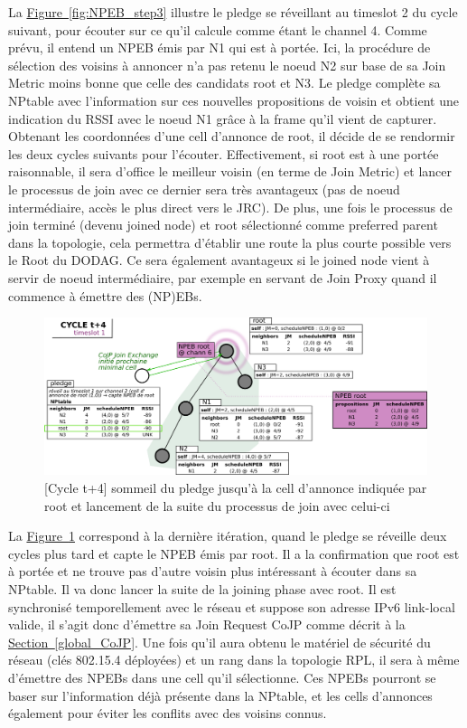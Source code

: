 \documentclass[]{report}
\newcommand{\wordlink}[2]{\hyperref[#2]{#1~\ref{#2}}}
\begin{document}
La \wordlink{Figure}{fig:NPEB_step3} illustre le pledge se réveillant au timeslot 2 du cycle suivant, pour écouter sur ce qu'il calcule comme étant le channel 4. Comme prévu, il entend un NPEB émis par N1 qui est à portée. Ici, la procédure de sélection des voisins à annoncer n'a pas retenu le noeud N2 sur base de sa Join Metric moins bonne que celle des candidats root et N3. Le pledge complète sa NPtable avec l'information sur ces nouvelles propositions de voisin et obtient une indication du RSSI avec le noeud N1 grâce à la frame qu'il vient de capturer. Obtenant les coordonnées d'une cell d'annonce de root, il décide de se rendormir les deux cycles suivants pour l'écouter. Effectivement, si root est à une portée raisonnable, il sera d'office le meilleur voisin (en terme de Join Metric) et lancer le processus de join avec ce dernier sera très avantageux (pas de noeud intermédiaire, accès le plus direct vers le JRC). De plus, une fois le processus de join terminé (devenu joined node) et root sélectionné comme preferred parent dans la topologie, cela permettra d'établir une route la plus courte possible vers le Root du DODAG. Ce sera également avantageux si le joined node vient à servir de noeud intermédiaire, par exemple en servant de Join Proxy quand il commence à émettre des (NP)EBs.

\newpage

 \vspace{0.4cm}
	\begin{figure}[!h]
	\centering
	\includegraphics[width=\linewidth]{NPEB_step4}
	\caption{[Cycle t+4] sommeil du pledge jusqu'à la cell d'annonce indiquée par root et lancement de la suite du processus de join avec celui-ci}
	\label{fig:NPEB_step4}
	\end{figure}
\vspace{0.4cm}

La \wordlink{Figure}{fig:NPEB_step4} correspond à la dernière itération, quand le pledge se réveille deux cycles plus tard et capte le NPEB émis par root. Il a la confirmation que root est à portée et ne trouve pas d'autre voisin plus intéressant à écouter dans sa NPtable. Il va donc lancer la suite de la joining phase avec root. Il est synchronisé temporellement avec le réseau et suppose son adresse IPv6 link-local valide, il s'agit donc d'émettre sa Join Request CoJP comme décrit à la \wordlink{Section}{global_CoJP}. Une fois qu'il aura obtenu le matériel de sécurité du réseau (clés 802.15.4 déployées) et un rang dans la topologie RPL, il sera à même d'émettre des NPEBs dans une cell qu'il sélectionne. Ces NPEBs pourront se baser sur l'information déjà présente dans la NPtable, et les cells d'annonces également pour éviter les conflits avec des voisins connus.\\
\end{document}
